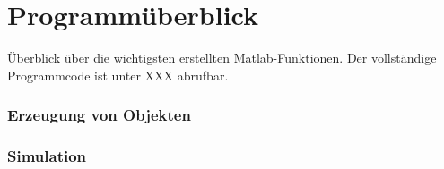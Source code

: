 \chapter{Programmüberblick}
Überblick über die wichtigsten erstellten Matlab-Funktionen. Der vollständige Programmcode ist unter XXX abrufbar.
 
\subsection*{Erzeugung von Objekten}
\begin{description}[style=nextline]
\item[scatterObjects]
\end{description}
\subsection*{Simulation}



